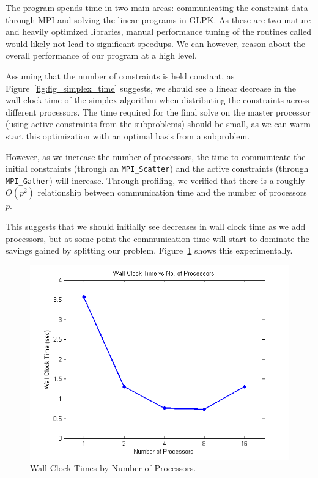 \documentclass[12pt]{article}
\begin{document}
The program spends time in two main areas: communicating the constraint data through MPI and solving the linear programs in GLPK.  
As these are two mature and heavily optimized libraries, manual performance tuning of the routines called would likely not lead to significant speedups.
We can however, reason about the overall performance of our program at a high level.

Assuming that the number of constraints is held constant, as Figure~\ref{fig:fig_simplex_time} suggests, we should see a linear decrease in the wall clock time of the simplex algorithm when distributing the constraints across different processors.  
The time required for the final solve on the master processor (using active constraints from the subproblems) should be small, as we can warm-start this optimization with an optimal basis from a subproblem.

However, as we increase the number of processors, the time to communicate the initial constraints (through an \texttt{MPI\_Scatter}) and the active constraints (through \texttt{MPI\_Gather}) will increase.
Through profiling, we verified that there is a roughly $O(p^2)$ relationship between communication time and the number of processors $p$.

This suggests that we should initially see decreases in wall clock time as we add processors, but at some point the communication time will start to dominate the savings gained by splitting our problem.  
Figure~\ref{fig:wct_numproc} shows this experimentally.

\begin{figure}[ht]
    \centering
        \includegraphics[scale=0.9]{../plot/figs/wct_numproc.png}
    \caption{Wall Clock Times by Number of Processors.}
    \label{fig:wct_numproc}
\end{figure}
\end{document}
